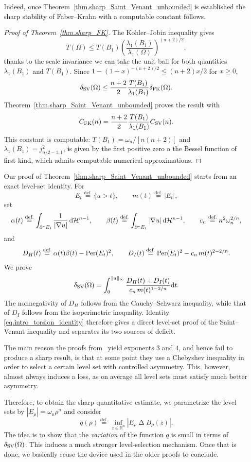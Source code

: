 \documentclass[11pt]{amsart}
\theoremstyle{plain}
\theoremstyle{definition}
\newcommand{\dHn}{\,\dd\mathcal{H}^{n-1}}
\newcommand{\eqdef}{\overset{\text{def.}}{=}}
\def\dd{{\rm d}}
\newcommand\Per{\mathop{\rm Per}}
\newcommand\SV{\mathop{\rm SV}}
\begin{document}
Indeed, once Theorem~\ref{thm.sharp_Saint_Venant_unbounded} is established the sharp stability of Faber--Krahn with a computable constant follows. 

\begin{proof}[Proof of Theorem~\ref{thm.sharp_FK}]
The Kohler--Jobin inequality gives
\[
 T(\Omega)\le T(B_1)
 \left(\frac{\lambda_1(B_1)}{\lambda_1(\Omega)}\right)^{(n+2)/2},
\]
thanks to the scale invariance we can take the unit ball for both quantities $\lambda_1(B_1)$ and $T(B_1)$. Since $1-(1+x)^{-(n+2)/2}\le (n+2)x/2$ for $x\ge0$,
\[
 \delta_{\rm SV}(\Omega)
 \le\frac{n+2}{2}\frac{T(B_1)}{\lambda_1(B_1)}
 \delta_{\rm FK}(\Omega).
\]
Theorem~\ref{thm.sharp_Saint_Venant_unbounded} proves the result with
\[
 C_{\rm FK}(n)
 =\frac{n+2}{2}\frac{T(B_1)}{\lambda_1(B_1)}C_{\rm SV}(n).
\]
This constant is computable: $T(B_1)=\omega_n/[n(n+2)]$ and
$\lambda_1(B_1)=j_{n/2-1,1}^2$, is given by the first positive zero o the Bessel function of first kind, which admits computable numerical approximations.
\end{proof}

Our proof of Theorem~\ref{thm.sharp_Saint_Venant_unbounded} starts from an exact level-set identity.
For
\[
  E_t\eqdef\{u>t\},\qquad m(t)\eqdef|E_t|,
\]
set
\[
  \alpha(t)\eqdef\int_{\partial^*E_t}\frac{1}{|\nabla u|}\dHn,
  \qquad
  \beta(t)\eqdef\int_{\partial^*E_t}|\nabla u|\dHn,
  \qquad
  c_n\eqdef n^2\omega_n^{2/n},
\]
and
\[
  D_H(t)\eqdef\alpha(t)\beta(t)-\Per(E_t)^2,
  \qquad
  D_I(t)\eqdef\Per(E_t)^2-c_n\,m(t)^{2-2/n}.
\]
We prove
\begin{equation}\label{eq.intro_torsion_identity}
  \delta_{\SV}(\Omega)
  =\int_0^{\|u\|_\infty}
  \frac{D_H(t)+D_I(t)}{c_n\,m(t)^{1-2/n}}\dd t.
\end{equation}
The nonnegativity of $D_H$ follows from the Cauchy--Schwarz inequality, while
that of $D_I$ follows from the isoperimetric inequality. Identity
\eqref{eq.intro_torsion_identity} therefore gives a direct level-set proof of
the Saint--Venant inequality and separates its two sources of deficit.


The main reason the proofs from~\cite{FuscoMaggiPratelli2009Eigenvalue,brasco2017spectral} yield exponents $3$ and $4$, and hence fail to produce a sharp result, is that at some point they use a Chebyshev inequality in order to select a certain level set with controlled asymmetry. This, however, almost always induces a loss, as on average all level sets must satisfy much better asymmetry.

Therefore, to obtain the sharp quantitative estimate, we parametrize the level sets by
$|E_\rho|=\omega_n\rho^n$ and consider
\[
  q(\rho)\eqdef
  \inf_{z\in\mathbb R^n}|E_\rho\mathbin\Delta B_\rho(z)|.
\]
The idea is to show that the \emph{variation} of the function $q$ is small in terms of $\delta_{\SV}(\Omega)$. This induces a much stronger level-selection mechanism. Once that is done, we basically reuse the device used in the older proofs to conclude.
\end{document}
